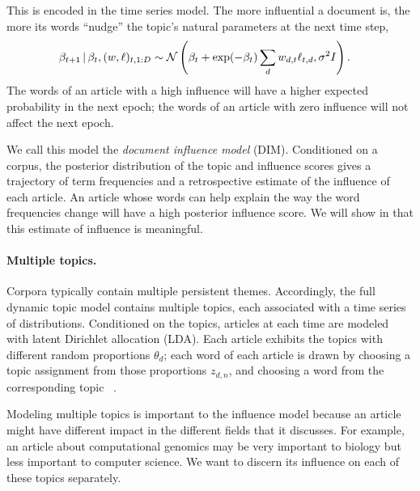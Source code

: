 This is encoded in the time series model.  The more influential a
document is, the more its words ``nudge'' the topic's natural
parameters at the next time step,
\begin{equation}
  \begin{split}
    \label{eq:logistic-normal-influence}
    \beta_{t+1} \, | \, & \beta_t, (w, \ell)_{t,1:D} \sim
    \mathcal{N}\left(
      \beta_{t} +
      \exp(-\beta_t) \sum_d w_{d,t} \ell_{t,d},
      \sigma^2 I
    \right).
  \end{split}
\end{equation}
The words of an article with a high influence will have a higher
expected probability in the next epoch; the words of an article
with zero influence will not affect the next epoch.


We call this model the \textit{document influence model}
(DIM). Conditioned on a corpus, the posterior distribution of the
topic and influence scores gives a trajectory of term frequencies and
a retrospective estimate of the influence of each article.  An article
whose words can help explain the way the word frequencies change will
have a high posterior influence score.  We will show in 
that this estimate of influence is meaningful.

\paragraph{Multiple topics.}  Corpora typically contain multiple
persistent themes.  Accordingly, the full dynamic topic model contains
multiple topics, each associated with a time series of distributions.
Conditioned on the topics, articles at each time are modeled
with latent Dirichlet allocation (LDA).  Each article exhibits the
topics with different random proportions $\theta_d$; each word of each
article is drawn by choosing a topic assignment from those proportions
$z_{d,n}$, and choosing a word from the corresponding topic
~\citep{blei:2003}.

Modeling multiple topics is important to the influence model because
an article might have different impact in the different fields that it
discusses.  For example, an article about computational genomics may
be very important to biology but less important to computer science.
We want to discern its influence on each of these topics separately.

